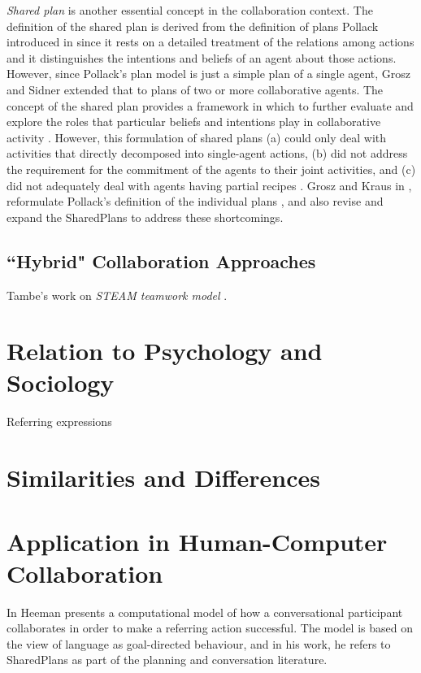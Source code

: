 \documentclass[11pt]{article}
\begin{document}
\textit{Shared plan} is another essential concept in the collaboration context.
The definition of the shared plan is derived from the definition of plans
Pollack introduced in \cite{pollack:plan-inference,
pollack:plan-mental-attitudes} since it rests on a detailed treatment of the
relations among actions and it distinguishes the intentions and beliefs of an
agent about those actions. However, since Pollack's plan model is just a simple
plan of a single agent, Grosz and Sidner extended that to plans of two or more
collaborative agents. The concept of the shared plan provides a framework in
which to further evaluate and explore the roles that particular beliefs and
intentions play in collaborative activity \cite{lochbaum:plan-models}. However,
this formulation of shared plans (a) could only deal with activities that
directly decomposed into single-agent actions, (b) did not address the
requirement for the commitment of the agents to their joint activities, and (c)
did not adequately deal with agents having partial recipes
\cite{grosz:collaboration}. Grosz and Kraus in \cite{grosz:collaboration},
reformulate Pollack's definition of the individual plans
\cite{pollack:plan-mental-attitudes}, and also revise and expand the SharedPlans
to address these shortcomings.

\subsection{``Hybrid" Collaboration Approaches}

Tambe's work on \textit{STEAM teamwork model} \cite{tambe:flexible-teamwork}.

\section{Relation to Psychology and Sociology}

Referring expressions \cite{heeman:model-collaboration-referring}

\section{Similarities and Differences}

\section{Application in Human-Computer Collaboration}

In \cite{heeman:model-collaboration-referring} Heeman presents a computational
model of how a conversational participant collaborates in order to make a
referring action successful. The model is based on the view of language as
goal-directed behaviour, and in his work, he refers to SharedPlans as part of
the planning and conversation literature.
\end{document}
